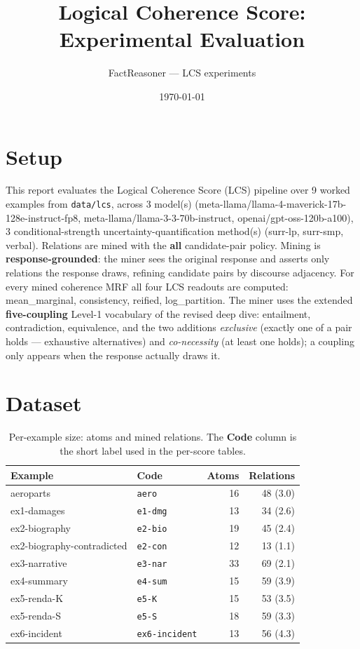 \documentclass[11pt]{article}
\title{Logical Coherence Score: Experimental Evaluation}
\author{FactReasoner --- LCS experiments}
\date{\today}
\begin{document}
\maketitle

\section{Setup}

This report evaluates the Logical Coherence Score (LCS) pipeline over 9 worked examples from \texttt{data/lcs}, across 3 model(s) (meta-llama/llama-4-maverick-17b-128e-instruct-fp8, meta-llama/llama-3-3-70b-instruct, openai/gpt-oss-120b-a100), 3 conditional-strength uncertainty-quantification method(s) (surr-lp, surr-smp, verbal). Relations are mined with the \textbf{all} candidate-pair policy. Mining is \textbf{response-grounded}: the miner sees the original response and asserts only relations the response draws, refining candidate pairs by discourse adjacency. For every mined coherence MRF all four LCS readouts are computed: mean\_marginal, consistency, reified, log\_partition. The miner uses the extended \textbf{five-coupling} Level-1 vocabulary of the revised deep dive: entailment, contradiction, equivalence, and the two additions \emph{exclusive} (exactly one of a pair holds --- exhaustive alternatives) and \emph{co-necessity} (at least one holds); a coupling only appears when the response actually draws it. 

\section{Dataset}

\begin{table}[htbp]
\centering
\small
\caption{Per-example size: atoms and mined relations. The \textbf{Code} column is the short label used in the per-score tables.}
\label{tab:coverage}
\begin{tabular}{llrr}
\toprule
Example & Code & Atoms & Relations \\
\midrule
aeroparts & \texttt{aero} & 16 & 48 (3.0) \\
ex1-damages & \texttt{e1-dmg} & 13 & 34 (2.6) \\
ex2-biography & \texttt{e2-bio} & 19 & 45 (2.4) \\
ex2-biography-contradicted & \texttt{e2-con} & 12 & 13 (1.1) \\
ex3-narrative & \texttt{e3-nar} & 33 & 69 (2.1) \\
ex4-summary & \texttt{e4-sum} & 15 & 59 (3.9) \\
ex5-renda-K & \texttt{e5-K} & 15 & 53 (3.5) \\
ex5-renda-S & \texttt{e5-S} & 18 & 59 (3.3) \\
ex6-incident & \texttt{ex6-incident} & 13 & 56 (4.3) \\
\bottomrule
\end{tabular}
\end{table}
\end{document}
